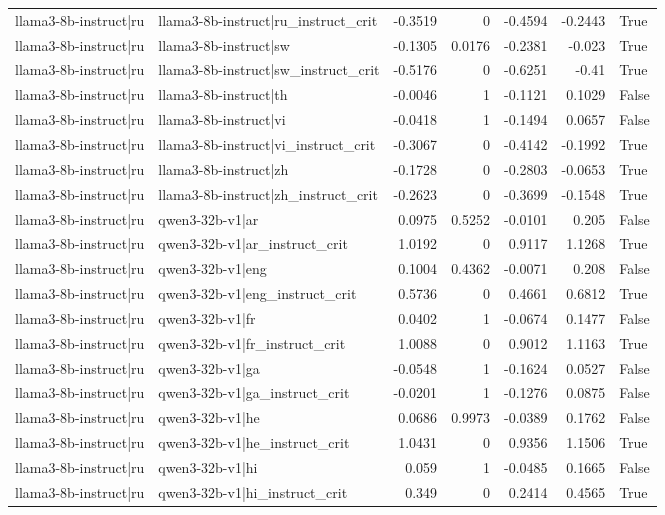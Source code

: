 \begin{table}
\begin{tabular}{l l r r r r l}
llama3-8b-instruct|ru & llama3-8b-instruct|ru_instruct_crit & -0.3519 & 0 & -0.4594 & -0.2443 & True \\
llama3-8b-instruct|ru & llama3-8b-instruct|sw & -0.1305 & 0.0176 & -0.2381 & -0.023 & True \\
llama3-8b-instruct|ru & llama3-8b-instruct|sw_instruct_crit & -0.5176 & 0 & -0.6251 & -0.41 & True \\
llama3-8b-instruct|ru & llama3-8b-instruct|th & -0.0046 & 1 & -0.1121 & 0.1029 & False \\
llama3-8b-instruct|ru & llama3-8b-instruct|vi & -0.0418 & 1 & -0.1494 & 0.0657 & False \\
llama3-8b-instruct|ru & llama3-8b-instruct|vi_instruct_crit & -0.3067 & 0 & -0.4142 & -0.1992 & True \\
llama3-8b-instruct|ru & llama3-8b-instruct|zh & -0.1728 & 0 & -0.2803 & -0.0653 & True \\
llama3-8b-instruct|ru & llama3-8b-instruct|zh_instruct_crit & -0.2623 & 0 & -0.3699 & -0.1548 & True \\
llama3-8b-instruct|ru & qwen3-32b-v1|ar & 0.0975 & 0.5252 & -0.0101 & 0.205 & False \\
llama3-8b-instruct|ru & qwen3-32b-v1|ar_instruct_crit & 1.0192 & 0 & 0.9117 & 1.1268 & True \\
llama3-8b-instruct|ru & qwen3-32b-v1|eng & 0.1004 & 0.4362 & -0.0071 & 0.208 & False \\
llama3-8b-instruct|ru & qwen3-32b-v1|eng_instruct_crit & 0.5736 & 0 & 0.4661 & 0.6812 & True \\
llama3-8b-instruct|ru & qwen3-32b-v1|fr & 0.0402 & 1 & -0.0674 & 0.1477 & False \\
llama3-8b-instruct|ru & qwen3-32b-v1|fr_instruct_crit & 1.0088 & 0 & 0.9012 & 1.1163 & True \\
llama3-8b-instruct|ru & qwen3-32b-v1|ga & -0.0548 & 1 & -0.1624 & 0.0527 & False \\
llama3-8b-instruct|ru & qwen3-32b-v1|ga_instruct_crit & -0.0201 & 1 & -0.1276 & 0.0875 & False \\
llama3-8b-instruct|ru & qwen3-32b-v1|he & 0.0686 & 0.9973 & -0.0389 & 0.1762 & False \\
llama3-8b-instruct|ru & qwen3-32b-v1|he_instruct_crit & 1.0431 & 0 & 0.9356 & 1.1506 & True \\
llama3-8b-instruct|ru & qwen3-32b-v1|hi & 0.059 & 1 & -0.0485 & 0.1665 & False \\
llama3-8b-instruct|ru & qwen3-32b-v1|hi_instruct_crit & 0.349 & 0 & 0.2414 & 0.4565 & True \\

\end{tabular}
\end{table}
